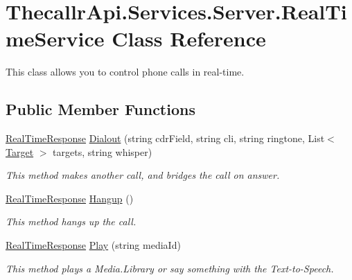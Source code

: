 \hypertarget{class_thecallr_api_1_1_services_1_1_server_1_1_real_time_service}{\section{Thecallr\+Api.\+Services.\+Server.\+Real\+Time\+Service Class Reference}
\label{class_thecallr_api_1_1_services_1_1_server_1_1_real_time_service}
}


This class allows you to control phone calls in real-\/time.  


\subsection*{Public Member Functions}
\begin{DoxyCompactItemize}
\item 
\hyperlink{class_thecallr_api_1_1_objects_1_1_real_time_1_1_real_time_response}{Real\+Time\+Response} \hyperlink{class_thecallr_api_1_1_services_1_1_server_1_1_real_time_service_a84722e63cf2d110ec8679b6764a04e3a}{Dialout} (string cdr\+Field, string cli, string ringtone, List$<$ \hyperlink{class_thecallr_api_1_1_objects_1_1_misc_1_1_target}{Target} $>$ targets, string whisper)
\begin{DoxyCompactList}\small\item\em This method makes another call, and bridges the call on answer. \end{DoxyCompactList}\item 
\hyperlink{class_thecallr_api_1_1_objects_1_1_real_time_1_1_real_time_response}{Real\+Time\+Response} \hyperlink{class_thecallr_api_1_1_services_1_1_server_1_1_real_time_service_a5a4dcc847bb702afce43876047507fe0}{Hangup} ()
\begin{DoxyCompactList}\small\item\em This method hangs up the call. \end{DoxyCompactList}\item 
\hyperlink{class_thecallr_api_1_1_objects_1_1_real_time_1_1_real_time_response}{Real\+Time\+Response} \hyperlink{class_thecallr_api_1_1_services_1_1_server_1_1_real_time_service_ab7f2eada0f38e99b789af1e98b26b77e}{Play} (string media\+Id)
\begin{DoxyCompactList}\small\item\em This method plays a Media.\+Library or say something with the Text-\/to-\/\+Speech. \end{DoxyCompactList}\item 

\end{DoxyCompactItemize}
